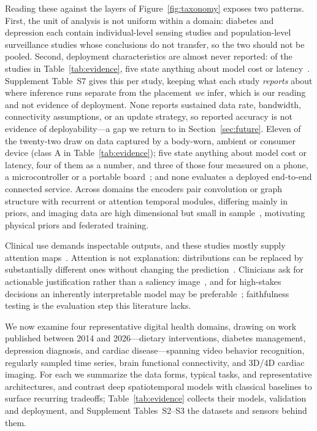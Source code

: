 \documentclass[journal]{IEEEtran}
\begin{document}
Reading these against the layers of Figure~\ref{fig:taxonomy} exposes two patterns. First, the unit of analysis is not uniform within a domain: diabetes and depression each contain individual-level sensing studies and population-level surveillance studies whose conclusions do not transfer, so the two should not be pooled. Second, deployment characteristics are almost never reported: of the studies in Table~\ref{tab:evidence}, five state anything about model cost or latency~\cite{5,Li2020GluNet,verbiest2023gaitstride,lin2024smapen,li2026edgeischemia}. Supplement Table~S7 gives this per study, keeping what each study \emph{reports} about where inference runs separate from the placement \emph{we} infer, which is our reading and not evidence of deployment. None reports sustained data rate, bandwidth, connectivity assumptions, or an update strategy, so reported accuracy is not evidence of deployability---a gap we return to in Section~\ref{sec:future}. Eleven of the twenty-two draw on data captured by a body-worn, ambient or consumer device (class A in Table~\ref{tab:evidence}); five state anything about model cost or latency, four of them as a number, and three of those four measured on a phone, a microcontroller or a portable board~\cite{Li2020GluNet,verbiest2023gaitstride,lin2024smapen}; and none evaluates a deployed end-to-end connected service.  Across domains the encoders pair convolution or graph structure with recurrent or attention temporal modules, differing mainly in priors, and imaging data are high dimensional but small in sample~\cite{4,5,6}, motivating physical priors and federated training.

Clinical use demands inspectable outputs, and these studies mostly supply attention maps~\cite{2,4}. Attention is not explanation: distributions can be replaced by substantially different ones without changing the prediction~\cite{jain2019attention}. Clinicians ask for actionable justification rather than a saliency image~\cite{tonekaboni2019clinicians}, and for high-stakes decisions an inherently interpretable model may be preferable~\cite{rudin2019stopexplaining}; faithfulness testing is the evaluation step this literature lacks.

\else
We now examine four representative digital health domains, drawing on work published between 2014 and 2026---dietary interventions, diabetes management, depression diagnosis, and cardiac disease---spanning video behavior recognition, regularly sampled time series, brain functional connectivity, and 3D/4D cardiac imaging. For each we summarize the data forms, typical tasks, and representative architectures, and contrast deep spatiotemporal models with classical baselines to surface recurring tradeoffs; Table~\ref{tab:evidence} collects their models, validation and deployment, and Supplement Tables~S2--S3 the datasets and sensors behind them.
\end{document}
